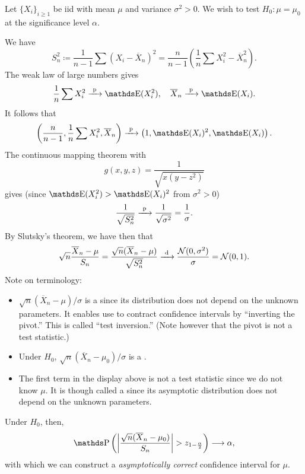 \documentclass[letterpaper, 10pt]{article}
\begin{document}
\begin{example}
  Let \(\{X_i\}_{i \geq 1}\) be iid with mean \(\mu\) and variance  \(\sigma^2 > 0\).
  We wish to test \(H_0: \mu = \mu_0\) at the significance level \(\alpha\).

  We have
  \[
    S_n^2
    \coloneqq \frac{1}{n - 1} \sum (X_i - \overline{X}_n)^2
    = \frac{n}{n - 1} \left( \frac{1}{n} \sum X_i^2 - \overline{X}_n^2 \right).
  \]
  The weak law of large numbers gives
  \[
    \frac{1}{n} \sum X_i^2 \longprobto \E(X_i^2), \quad
    \overline{X}_n \longprobto \E(X_i).
  \]
  It follows that
  \[
    \left( \frac{n}{n - 1}, \frac{1}{n} \sum X_i^2, \overline{X}_n \right)
    \longprobto \left( 1, \E(X_i)^2, \E(X_i) \right).
  \]
  The continuous mapping theorem with
  \[
    g(x, y, z) = \frac{1}{\sqrt{x (y - z^2)}}
  \]
  gives (since \(\E(X_i^2) > \E(X_i)^2\) from \(\sigma^2 > 0\))
  \[
    \frac{1}{\sqrt{S_n^2}}
    \xrightarrow{\ \mathrm{p}\ } \frac{1}{\sqrt{\sigma^2}} = \frac{1}{\sigma}.
  \]
  By Slutsky's theorem, we have then that
  \[
    \sqrt{n} \frac{\overline{X}_n - \mu}{S_n}
    = \frac{\sqrt{n} (\overline{X}_n - \mu)}{\sqrt{S_n^2}}
    \xrightarrow{\ \mathrm{d}\ } \frac{\mathcal{N}(0, \sigma^2)}{\sigma}
    = \mathcal{N}(0, 1).
  \]
  Note on terminology:
  \begin{itemize}
    \item \(\sqrt{n} (\overline{X}_n - \mu) / \sigma\) is a  since its distribution does not depend on the unknown parameters.
      It enables use to contract confidence intervals by ``inverting the pivot.''
      This is called ``test inversion.'' (Note however that the pivot is not a test statistic.)
    \item Under \(H_0\), \(\sqrt{n} (\overline{X}_n - \mu_0) / \sigma\) is a .
    \item The first term in the display above is not a test statistic since we do not know \(\mu\).
      It is though called a  since its asymptotic distribution does not depend on the unknown parameters.
  \end{itemize}
  Under \(H_0\), then,
  \[
    \P\left( \abs*{\frac{\sqrt{n} (\overline{X}_n - \mu_0)}{S_n}} > z_{1 - \frac{\alpha}{2}} \right)
    \longrightarrow \alpha,
  \]
  with which we can construct a \emph{asymptotically correct} confidence interval for \(\mu\).
\end{example}
\end{document}
